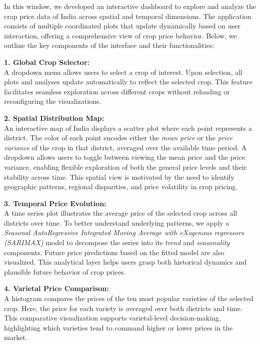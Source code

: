 \documentclass[a4paper, 12pt]{article}
\begin{document}
In this window, we developed an interactive dashboard to explore and analyze the crop price data of India across spatial and temporal dimensions. The application consists of multiple coordinated plots that update dynamically based on user interaction, offering a comprehensive view of crop price behavior. Below, we outline the key components of the interface and their functionalities:

\vspace{0.5em}
\textbf{1. Global Crop Selector:} \\
    A dropdown menu allows users to select a crop of interest. Upon selection, all plots and analyses update automatically to reflect the selected crop. This feature facilitates seamless exploration across different crops without reloading or reconfiguring the visualizations.
    
\vspace{0.5em}
\textbf{2. Spatial Distribution Map:} \\
An interactive map of India displays a scatter plot where each point represents a district. The color of each point encodes either the \emph{mean price} or the \emph{price variance} of the crop in that district, averaged over the available time period. A dropdown allows users to toggle between viewing the mean price and the price variance, enabling flexible exploration of both the general price levels and their stability across time. This spatial view is motivated by the need to identify geographic patterns, regional disparities, and price volatility in crop pricing.

\vspace{0.5em}
\textbf{3. Temporal Price Evolution:} \\
    A time series plot illustrates the average price of the selected crop across all districts over time. To better understand underlying patterns, we apply a \textit{Seasonal AutoRegressive Integrated Moving Average with eXogenous regressors (SARIMAX)} model to decompose the series into its \emph{trend} and \emph{seasonality} components. Future price predictions based on the fitted model are also visualized. This analytical layer helps users grasp both historical dynamics and plausible future behavior of crop prices.
    
\vspace{0.5em}
\textbf{4. Varietal Price Comparison:} \\
    A histogram compares the prices of the ten most popular varieties of the selected crop. Here, the price for each variety is averaged over both districts and time. This comparative visualization supports varietal-level decision-making, highlighting which varieties tend to command higher or lower prices in the market.
\end{document}

